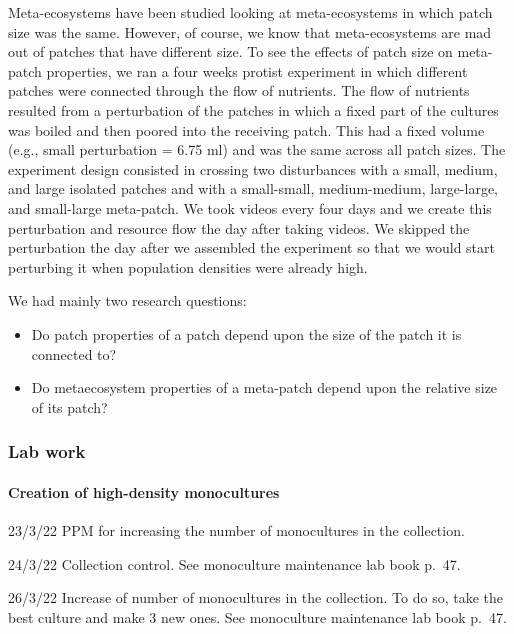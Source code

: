 \documentclass[
]{article}
\begin{document}
Meta-ecosystems have been studied looking at meta-ecosystems in which
patch size was the same. However, of course, we know that
meta-ecosystems are mad out of patches that have different size. To see
the effects of patch size on meta-patch properties, we ran a four weeks
protist experiment in which different patches were connected through the
flow of nutrients. The flow of nutrients resulted from a perturbation of
the patches in which a fixed part of the cultures was boiled and then
poored into the receiving patch. This had a fixed volume (e.g., small
perturbation = 6.75 ml) and was the same across all patch sizes. The
experiment design consisted in crossing two disturbances with a small,
medium, and large isolated patches and with a small-small,
medium-medium, large-large, and small-large meta-patch. We took videos
every four days and we create this perturbation and resource flow the
day after taking videos. We skipped the perturbation the day after we
assembled the experiment so that we would start perturbing it when
population densities were already high.

We had mainly two research questions:

\begin{itemize}
\item
  Do patch properties of a patch depend upon the size of the patch it is
  connected to?
\item
  Do metaecosystem properties of a meta-patch depend upon the relative
  size of its patch?
\end{itemize}

\hypertarget{lab-work}{%
\subsubsection{Lab work}\label{lab-work}}

\hypertarget{creation-of-high-density-monocultures}{%
\paragraph{Creation of high-density
monocultures}\label{creation-of-high-density-monocultures}}

23/3/22 PPM for increasing the number of monocultures in the collection.

24/3/22 Collection control. See monoculture maintenance lab book p.~47.

26/3/22 Increase of number of monocultures in the collection. To do so,
take the best culture and make 3 new ones. See monoculture maintenance
lab book p.~47.
\end{document}
